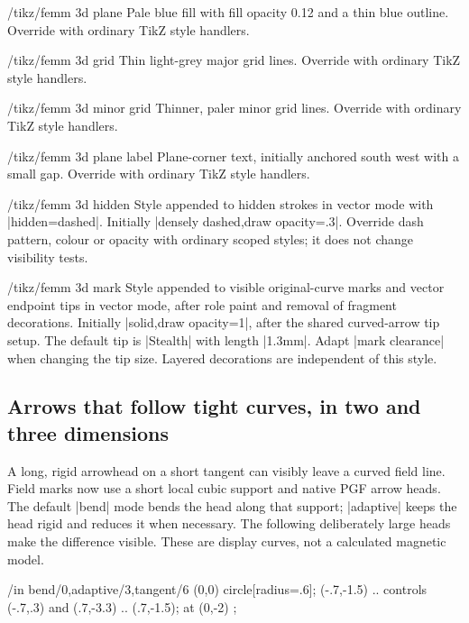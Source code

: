 \begin{key}{/tikz/femm 3d plane}
Pale blue fill with fill opacity 0.12 and a thin blue outline. Override with ordinary TikZ style handlers.
\end{key}
\begin{key}{/tikz/femm 3d grid}
Thin light-grey major grid lines. Override with ordinary TikZ style handlers.
\end{key}
\begin{key}{/tikz/femm 3d minor grid}
Thinner, paler minor grid lines. Override with ordinary TikZ style handlers.
\end{key}
\begin{key}{/tikz/femm 3d plane label}
Plane-corner text, initially anchored south west with a small gap. Override with ordinary TikZ style handlers.
\end{key}

\begin{key}{/tikz/femm 3d hidden}
Style appended to hidden strokes in vector mode with |hidden=dashed|.
Initially |densely dashed,draw opacity=.3|. Override dash pattern, colour or
opacity with ordinary scoped styles; it does not change visibility tests.
\end{key}
\begin{key}{/tikz/femm 3d mark}
Style appended to visible original-curve marks and vector endpoint tips in
vector mode, after role paint and removal of fragment decorations. Initially
|solid,draw opacity=1|, after the shared curved-arrow tip setup.
The default tip is |Stealth| with length |1.3mm|. Adapt |mark clearance| when
changing the tip size. Layered decorations are independent of this style.
\end{key}

\subsection{Arrows that follow tight curves, in two and three dimensions}
\label{sec:curved-arrows}
A long, rigid arrowhead on a short tangent can visibly leave a curved field
line. Field marks now use a short local cubic support and native PGF arrow
heads. The default |bend| mode bends the head along that support; |adaptive|
keeps the head rigid and reduces it when necessary. The following deliberately
large heads make the difference visible. These are display curves, not a
calculated magnetic model.
\begin{codeexample}[width=0pt]
\tikzpicture[femm/arrow length=2mm,femm/arrow width=1mm,
 femm/arrow spacing=9mm]
 \foreach \mode/\x in {bend/0,adaptive/3,tangent/6} {
  \scope[xshift=\x cm,femm/arrow mode=\mode]
     (0,0) circle[radius=.6];
     (-.7,-1.5) .. controls (-.7,.3) and (.7,-3.3) .. (.7,-1.5);
   \node[below] at (0,-2) {\tt\mode};
  \endscope
 }
\endtikzpicture
\end{codeexample}


